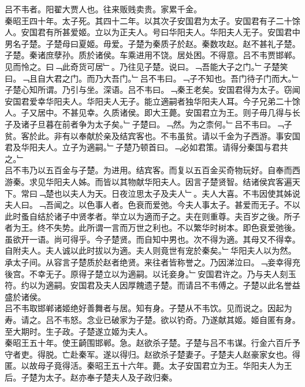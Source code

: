 \documentclass{zhvt-classic}
\begin{document}

\hspace*{2em}吕不韦者。阳翟大贾人也。往来贩贱卖贵。家累千金。\\
\hspace*{2em}秦昭王四十年。太子死。其四十二年。以其次子安国君为太子。安国君有子二十馀人。安国君有所甚爱姬。立以为正夫人。号曰华阳夫人。华阳夫人无子。安国君中男名子楚。子楚母曰夏姬。毋爱。子楚为秦质子於赵。秦数攻赵。赵不甚礼子楚。\\
\hspace*{2em}子楚。秦诸庶孽孙。质於诸侯。车乘进用不饶。居处困。不得意。吕不韦贾邯郸。见而怜之。曰﹁此奇货可居﹂。乃往见子楚。说曰。﹁吾能大子之门。﹂子楚笑曰。﹁且自大君之门。而乃大吾门。﹂吕不韦曰。﹁子不知也。吾门待子门而大。﹂子楚心知所谓。乃引与坐。深语。吕不韦曰。﹁秦王老矣。安国君得为太子。窃闻安国君爱幸华阳夫人。华阳夫人无子。能立適嗣者独华阳夫人耳。今子兄弟二十馀人。子又居中。不甚见幸。久质诸侯。即大王薨。安国君立为王。则子毋几得与长子及诸子旦暮在前者争为太子矣。﹂子楚曰。﹁然。为之柰何。﹂吕不韦曰。﹁子贫。客於此。非有以奉献於亲及结宾客也。不韦虽贫。请以千金为子西游。事安国君及华阳夫人。立子为適嗣。﹂子楚乃顿首曰。﹁必如君策。请得分秦国与君共之。﹂\\
\hspace*{2em}吕不韦乃以五百金与子楚。为进用。结宾客。而复以五百金买奇物玩好。自奉而西游秦。求见华阳夫人姊。而皆以其物献华阳夫人。因言子楚贤智。结诸侯宾客遍天下。常曰﹁楚也以夫人为天。日夜泣思太子及夫人﹂。夫人大喜。不韦因使其姊说夫人曰。﹁吾闻之。以色事人者。色衰而爱弛。今夫人事太子。甚爱而无子。不以此时蚤自结於诸子中贤孝者。举立以为適而子之。夫在则重尊。夫百岁之後。所子者为王。终不失势。此所谓一言而万世之利也。不以繁华时树本。即色衰爱弛後。虽欲开一语。尚可得乎。今子楚贤。而自知中男也。次不得为適。其母又不得幸。自附夫人。夫人诚以此时拔以为適。夫人则竟世有宠於秦矣。﹂华阳夫人以为然。承太子间。从容言子楚质於赵者绝贤。来往者皆称誉之。乃因涕泣曰。﹁妾幸得充後宫。不幸无子。原得子楚立以为適嗣。以讬妾身。﹂安国君许之。乃与夫人刻玉符。约以为適嗣。安国君及夫人因厚餽遗子楚。而请吕不韦傅之。子楚以此名誉益盛於诸侯。\\
\hspace*{2em}吕不韦取邯郸诸姬绝好善舞者与居。知有身。子楚从不韦饮。见而说之。因起为寿。请之。吕不韦怒。念业已破家为子楚。欲以钓奇。乃遂献其姬。姬自匿有身。至大期时。生子政。子楚遂立姬为夫人。\\
\hspace*{2em}秦昭王五十年。使王齮围邯郸。急。赵欲杀子楚。子楚与吕不韦谋。行金六百斤予守者吏。得脱。亡赴秦军。遂以得归。赵欲杀子楚妻子。子楚夫人赵豪家女也。得匿。以故母子竟得活。秦昭王五十六年。薨。太子安国君立为王。华阳夫人为王后。子楚为太子。赵亦奉子楚夫人及子政归秦。\\
\end{document}
